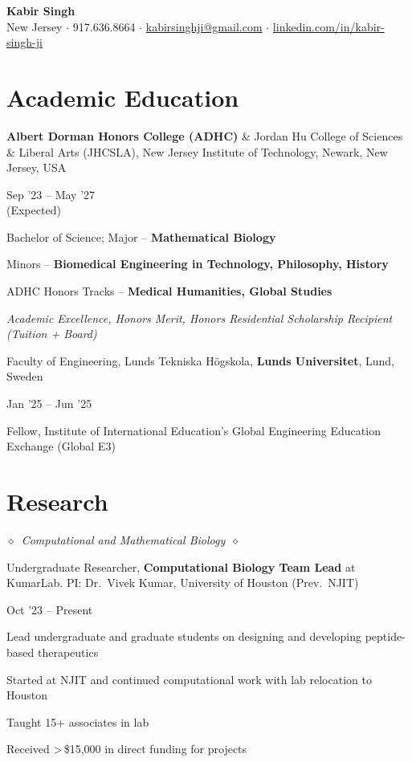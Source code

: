 \documentclass[10pt,a4paper]{article}
\newlength{\entrygap}\setlength{\entrygap}{5pt}
\newcommand{\entry}[2]{%
  \par\vspace{\entrygap}%
  \noindent
  \begin{minipage}[t]{0.795\textwidth}\raggedright #1\end{minipage}%
  \hfill
  \begin{minipage}[t]{0.19\textwidth}\raggedleft\small #2\end{minipage}%
  \par\penalty500
}
\newcommand{\subhead}[1]{%
  \par\vspace{10pt}\noindent$\diamond$\ {\fontsize{11}{13}\selectfont\itshape #1}\ $\diamond$\par\vspace{3pt}}
\begin{document}
\begin{center}
  {\LARGE\bfseries Kabir Singh}\\[4pt]
  {\small New Jersey $\cdot$
   917.636.8664 $\cdot$
   \href{mailto:kabirsinghji@gmail.com}{kabirsinghji@gmail.com} $\cdot$
   \href{https://www.linkedin.com/in/kabir-singh-ji}{linkedin.com/in/kabir-singh-ji}}
\end{center}
\vspace{2pt}

\section{Academic Education}

\entry{\textbf{Albert Dorman Honors College (ADHC)} \& Jordan Hu College of Sciences \& Liberal Arts (JHCSLA), New Jersey Institute of Technology, Newark, New Jersey, USA}{Sep '23 -- May '27\\(Expected)}
\begin{cvitems}
  \item Bachelor of Science; Major -- \textbf{Mathematical Biology}
  \item Minors -- \textbf{Biomedical Engineering in Technology, Philosophy, History}
  \item ADHC Honors Tracks -- \textbf{Medical Humanities, Global Studies}
  \item \textit{Academic Excellence, Honors Merit, Honors Residential Scholarship Recipient (Tuition + Board)}
\end{cvitems}

\entry{Faculty of Engineering, Lunds Tekniska Högskola, \textbf{Lunds Universitet}, Lund, Sweden}{Jan '25 -- Jun '25}
\begin{cvitems}
  \item Fellow, Institute of International Education's Global Engineering Education Exchange (Global E3)
\end{cvitems}


\section{Research}

\subhead{Computational and Mathematical Biology}
\entry{Undergraduate Researcher, \textbf{Computational Biology Team Lead} at KumarLab. PI: Dr.~Vivek Kumar, University of Houston (Prev.\ NJIT)}{Oct '23 -- Present}
\begin{cvitems}
  \item Lead undergraduate and graduate students on designing and developing peptide-based therapeutics
  \item Started at NJIT and continued computational work with lab relocation to Houston
  \item Taught 15+ associates in lab
  \item Received \textgreater\,\$15,000 in direct funding for projects
\end{cvitems}
\end{document}
